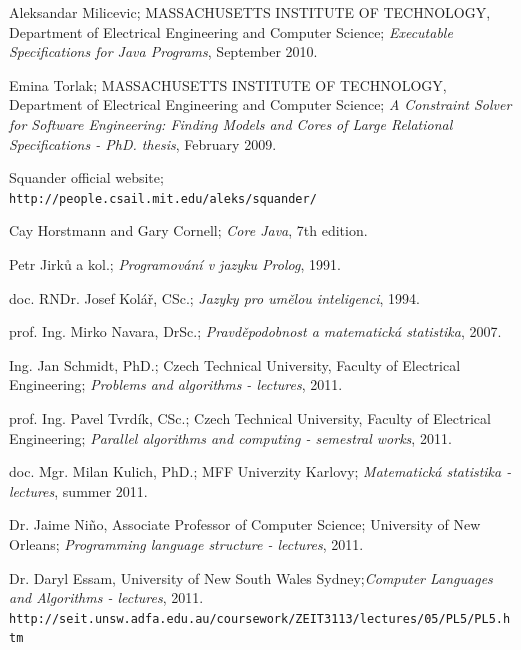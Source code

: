 \documentclass[11pt,twoside,a4paper]{book}
\begin{document}
\begin{thebibliography}{1}

Aleksandar Milicevic; MASSACHUSETTS INSTITUTE OF TECHNOLOGY, Department of
Electrical Engineering and Computer Science; \textit{Executable Specifications
for Java Programs}, September 2010.

Emina Torlak; MASSACHUSETTS INSTITUTE OF TECHNOLOGY, Department of
Electrical Engineering and Computer Science; \textit{A Constraint Solver for
Software Engineering: Finding Models and Cores of Large Relational
Specifications - PhD. thesis}, February 2009.


Squander
official website;\\\verb|http://people.csail.mit.edu/aleks/squander/|


Cay Horstmann and Gary Cornell; \textit{Core Java}, 7th edition.

Petr Jirků a kol.; \textit{Programování v jazyku Prolog}, 1991.

doc. RNDr. Josef Kolář, CSc.; \textit{Jazyky pro umělou inteligenci}, 1994.


prof. Ing. Mirko Navara, DrSc.; \textit{Pravděpodobnost a matematická
statistika}, 2007.


Ing. Jan Schmidt, PhD.; Czech Technical University, Faculty of Electrical
Engineering; \textit{Problems and algorithms - lectures}, 2011.


prof. Ing. Pavel Tvrdík, CSc.; Czech Technical University, Faculty of Electrical
Engineering; \textit{Parallel algorithms and computing - semestral works}, 2011.

doc. Mgr. Milan Kulich, PhD.; MFF
Univerzity Karlovy; \textit{Matematická statistika - lectures}, summer 2011.


Dr. Jaime Niño, Associate Professor of Computer Science; University of New
Orleans; \textit{Programming language structure - lectures}, 2011.

Dr. Daryl Essam, University of New South Wales
Sydney;\textit{Computer Languages and Algorithms - lectures}, 2011.\\
\verb|http://seit.unsw.adfa.edu.au/coursework/ZEIT3113/lectures/05/PL5/PL5.htm|



\end{thebibliography}
\end{document}
